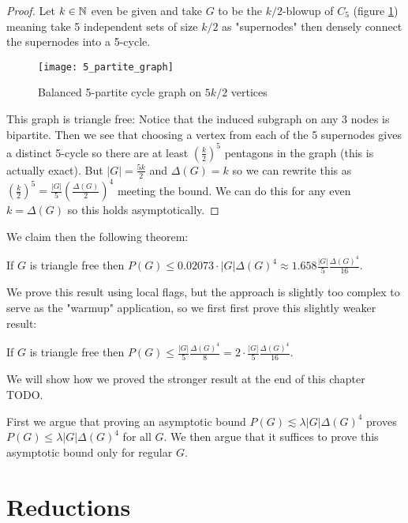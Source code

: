 \begin{proof}
    Let $k\in\mathbb{N}$ even be given and take $G$ to be the $k/2$-blowup of $C_5$
    (figure \ref{fig:5_partite_graph}) meaning take 5 independent sets of size $k/2$ as
    "supernodes" then densely connect the supernodes into a 5-cycle.
    \begin{figure}[ht]
        \centering
        \texttt{[image: 5\_partite\_graph]}
        \caption{Balanced 5-partite cycle graph on $5k/2$ vertices}
        \label{fig:5_partite_graph}
    \end{figure}
    This graph is triangle free: Notice that the induced subgraph on any 3 nodes is bipartite.
    Then we see that choosing
    a vertex from each of the 5 supernodes gives a distinct 5-cycle so there are at
    least $\left(\frac{k}{2}\right)^5$ pentagons in the graph (this is actually exact). But
    $|G|=\frac{5k}{2}$ and $\Delta(G)=k$ so we can rewrite this as
    $\left(\frac{k}{2}\right)^5 = \frac{|G|}{5}\left(\frac{\Delta(G)}{2}\right)^4$ meeting
    the bound. We can do this for any even $k=\Delta(G)$ so this holds asymptotically.
\end{proof}

We claim then the following theorem:
\begin{theorem}
    \label{thm:full_pentagon_bound}
    If $G$ is triangle free then
    $P(G) \leq 0.02073 \cdot |G|\Delta(G)^4 \approx 1.658\frac{|G|}{5}\frac{\Delta(G)^4}{16}$.
\end{theorem}

We prove this result using local flags, but the approach is slightly too complex to serve
as the "warmup" application, so we first first prove this slightly weaker result:

\begin{theorem}
    \label{thm:simple_pentagon_bound}
    If $G$ is triangle free then
    $P(G) \leq \frac{|G|}{5}\frac{\Delta(G)^4}{8} = 2\cdot\frac{|G|}{5}\frac{\Delta(G)^4}{16}$.
\end{theorem}

We will show how we proved the stronger result at the end of this chapter TODO.

First we argue that proving an asymptotic bound $P(G) \lesssim \lambda|G|\Delta(G)^4$
proves $P(G) \leq \lambda|G|\Delta(G)^4$ for all $G$.
We then argue that it suffices to prove this asymptotic bound only for regular $G$.

\section{Reductions}

